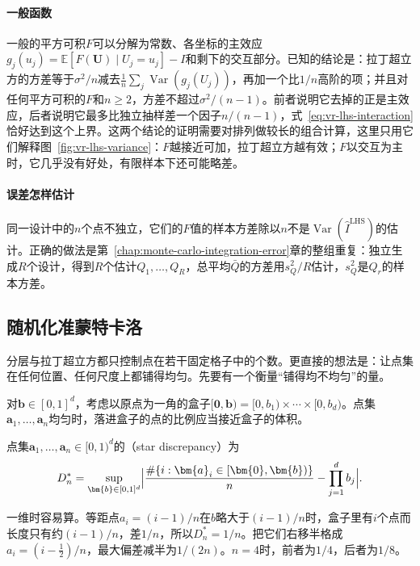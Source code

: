 \paragraph{一般函数}
一般的平方可积$F$可以分解为常数、各坐标的主效应$g_j(u_j)=\mathbb{E}[F(\bm{U})\mid U_j=u_j]-I$和剩下的交互部分。已知的结论是：拉丁超立方的方差等于$\sigma^2/n$减去$\frac1n\sum_j\operatorname{Var}(g_j(U_j))$，再加一个比$1/n$高阶的项；并且对任何平方可积的$F$和$n\geq2$，方差不超过$\sigma^2/(n-1)$。前者说明它去掉的正是主效应，后者说明它最多比独立抽样差一个因子$n/(n-1)$，式~\eqref{eq:vr-lhs-interaction}恰好达到这个上界。这两个结论的证明需要对排列做较长的组合计算，这里只用它们解释图~\ref{fig:vr-lhs-variance}：$F$越接近可加，拉丁超立方越有效；$F$以交互为主时，它几乎没有好处，有限样本下还可能略差。

\paragraph{误差怎样估计}
同一设计中的$n$个点不独立，它们的$F$值的样本方差除以$n$不是$\operatorname{Var}(\hat{I}^{\mathrm{LHS}})$的估计。正确的做法是第~\ref{chap:monte-carlo-integration-error}章的整组重复：独立生成$R$个设计，得到$R$个估计$Q_1,\dots,Q_R$，总平均$\bar{Q}$的方差用$s_Q^2/R$估计，$s_Q^2$是$Q_r$的样本方差。

\subsection{随机化准蒙特卡洛}
\label{sec:vr-rqmc}

分层与拉丁超立方都只控制点在若干固定格子中的个数。更直接的想法是：让点集在任何位置、任何尺度上都铺得均匀。先要有一个衡量“铺得均不均匀”的量。

对$\bm{b}\in[0,1]^d$，考虑以原点为一角的盒子$[\bm{0},\bm{b})=[0,b_1)\times\cdots\times[0,b_d)$。点集$\bm{a}_1,\dots,\bm{a}_n$均匀时，落进盒子的点的比例应当接近盒子的体积。

\begin{definition}[星差异]
\label{def:vr-star-discrepancy}
点集$\bm{a}_1,\dots,\bm{a}_n\in[0,1)^d$的（star discrepancy）为
\begin{equation}
 D_n^{*}=\sup_{\bm{b}\in[0,1]^d}\Bigl\lvert\frac{\#\{i:\bm{a}_i\in[\bm{0},\bm{b})\}}{n}-\prod_{j=1}^{d}b_j\Bigr\rvert .
 \label{eq:vr-star-discrepancy}
\end{equation}
\end{definition}

一维时容易算。等距点$a_i=(i-1)/n$在$b$略大于$(i-1)/n$时，盒子里有$i$个点而长度只有约$(i-1)/n$，差$1/n$，所以$D_n^{*}=1/n$。把它们右移半格成$a_i=(i-\tfrac12)/n$，最大偏差减半为$1/(2n)$。$n=4$时，前者为$1/4$，后者为$1/8$。

